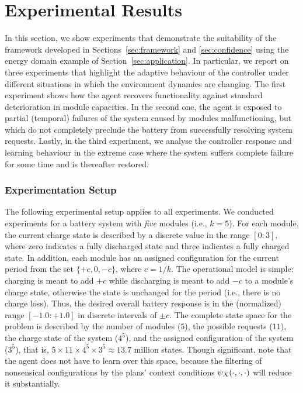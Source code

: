 
\section{Experimental Results}\label{sec:results}

In this section, we show experiments that demonstrate the suitability of the framework developed in Sections~\ref{sec:framework} and \ref{sec:confidence} using the energy domain example of Section~\ref{sec:application}. In particular, we report on three experiments that highlight the adaptive behaviour of the controller under different situations in which the environment dynamics are changing. 
The first experiment shows how the agent recovers functionality against standard deterioration in module capacities. In the second one, the agent is exposed to partial (temporal) failures of the system caused by modules malfunctioning, but which do not completely preclude the battery from successfully resolving system requests. Lastly, in the third experiment, we analyse the controller response and learning behaviour in the extreme case where the system suffers complete failure for some time and is thereafter restored.



\subsubsection{Experimentation Setup}

The following experimental setup applies to all experiments. 
We conducted experiments for a battery system with \emph{five} modules (i.e., $k=5$). For each module, the current charge state is described by a discrete value in the range $[0:3]$, where zero indicates a fully discharged state and three indicates a fully charged state. In addition, each module has an assigned configuration for the current period from the set $\{+c, 0, -c\}$, where $c=1/k$. The operational model is simple: charging is meant to add $+c$ while discharging is meant to add $-c$ to a module's charge state, otherwise the state is unchanged for the period (i.e., there is no charge loss).
Thus, the desired overall battery response is in the (normalized) range $[-1.0:+1.0]$ in discrete intervals of $\pm c$. 
The complete state space for the problem is described by the number of modules ($5$), the possible requests ($11$), the charge state of the system ($4^5$), and the assigned configuration of the system ($3^5$), that is, $5 \times 11 \times 4^5 \times 3^5 \approx 13.7$ million states. Though significant, note that the agent does not have to learn over this space, because the filtering of nonsensical configurations by the plans' context conditions $\psi_X(\cdot,\cdot,\cdot)$ will reduce it substantially.




